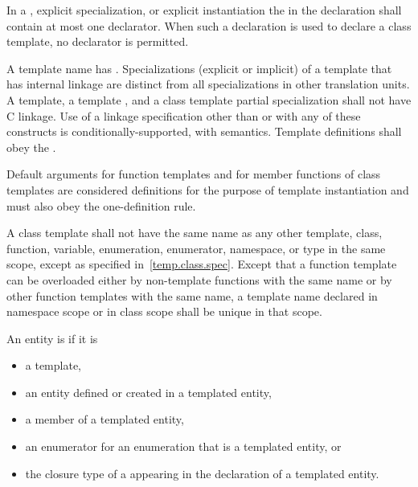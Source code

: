 \pnum
In a
,
explicit specialization, or explicit instantiation the
in the declaration shall contain at most one declarator.
When such a declaration is used to declare a class template,
no declarator is permitted.

\pnum
{}%
A template name has .
Specializations (explicit or implicit) of
a template that has internal linkage are
distinct from all specializations in other translation
units.
A template, a template , and a class
template partial specialization shall not have C linkage. Use of a linkage specification
other than  or  with any of these constructs is
conditionally-supported, with
 semantics.
Template definitions shall obey the .
\begin{note}
Default arguments for function templates and for member functions of
class templates are considered definitions for the purpose of template
instantiation and must also obey the one-definition rule.
\end{note}

\pnum
A class template shall not have the same name as any other
template, class, function, variable, enumeration, enumerator, namespace, or
type in the same scope, except as specified in~\ref{temp.class.spec}.
Except that a function template can be overloaded either by non-template
functions with the same name or by other function templates
with the same name,
a template name declared in namespace scope or in class scope shall be unique
in that scope.

\pnum
{}%
An entity is 
if it is
\begin{itemize}
\item a template,
\item an entity defined or created
      in a templated entity,
\item a member of a templated entity,
\item an enumerator for an enumeration that is a templated entity, or
\item the closure type of a 
      appearing in the declaration of a templated entity.
\end{itemize}

